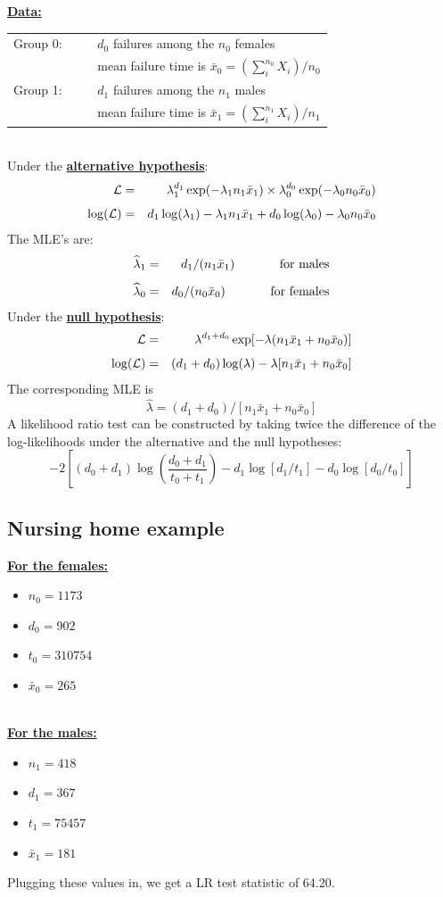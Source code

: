 \documentclass[11pt,psfig]{book}
\begin{document}
\underline{\bf Data:}\\[2ex]
\begin{tabular}{ll}
Group 0: ~~~ & $d_0$ failures among the $n_0$ females\\
             & mean failure time is $\bar{x}_0 = (\sum_i^{n_0} X_i)/n_0$\\[1ex]
Group 1: ~~~ & $d_1$ failures among the $n_1$ males\\
             & mean failure time is $\bar{x}_1 = (\sum_i^{n_1} X_i)/n_1$\\
\end{tabular}
\\[2ex]
Under the \underline{\bf alternative hypothesis}:
\begin{eqnarray*}
{\cal L} & = & \lambda_1^{d_1} \exp(-\lambda_1 n_1 \bar{x}_1) \times
  \lambda_0^{d_0} \exp(-\lambda_0 n_0 \bar{x}_0)\\[1ex]
\log({\cal L}) & = &  d_1 \log(\lambda_1) - \lambda_1 n_1 \bar{x}_1 +
      d_0 \log(\lambda_0) - \lambda_0 n_0 \bar{x}_0
\end{eqnarray*}
The MLE's are:
\begin{eqnarray*}
\widehat{\lambda}_1 & = & d_1/(n_1 \bar{x}_1) \hspace{0.5in}
\mbox{for males}\\[1ex]
\widehat{\lambda}_0 & = & d_0/(n_0 \bar{x}_0) \hspace{0.5in}
\mbox{for females}
\end{eqnarray*}
Under the  \underline{\bf null hypothesis}:
\begin{eqnarray*}
{\cal L} & = &  \lambda^{d_1+d_0}
     \exp[-\lambda (n_1 \bar{x}_1 + n_0 \bar{x}_0)]\\[1ex]
\log({\cal L}) & = &  (d_1 + d_0) \log(\lambda) - \lambda [ n_1 \bar{x}_1 +
       n_0 \bar{x}_0]
\end{eqnarray*}
The corresponding MLE is
\[ \widehat{\lambda}=(d_1+d_0)/[n_1 \bar{x}_1 + n_0 \bar{x}_0]\]
A likelihood ratio test can be constructed by taking twice
the difference of the log-likelihoods under the alternative
and the null hypotheses:
\[ -2 \left[ (d_0+d_1) \log \left(\frac{d_0+d_1}{t_0+t_1}\right) -
d_1 \log[d_1/t_1] - d_0 \log[d_0/t_0] \right] \]
\subsection{Nursing home example}
\underline{\bf For the females:}
\begin{itemize}
\item $n_0 = 1173$
\item $d_0 = 902$
\item $t_0 = 310754$
\item $\bar{x}_0 = 265 $
\end{itemize}
~\\[2ex]
\underline{\bf For the males:}
\begin{itemize}
\item $n_1 = 418$
\item $d_1 = 367$
\item $t_1 = 75457$
\item $\bar{x}_1 = 181 $
\end{itemize}
Plugging these values in, we get a LR test statistic of 64.20.
\end{document}
